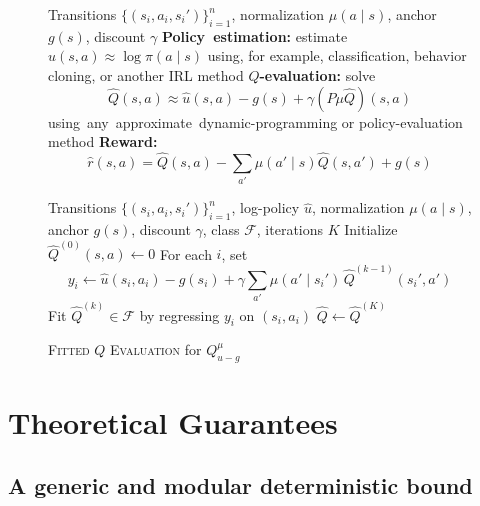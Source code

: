 \documentclass{article}
\newcommand{\1}{\mathbbm{1}}
\begin{document}
\begin{figure}[t]
\centering

\begin{minipage}[t]{0.48\linewidth}
\begin{algorithm}[H]
\caption{\textsc{Generalized Policy-to-\(Q\)-to-Reward (GenPQR)}}
\label{alg:generic-irl}
\begin{algorithmic}[1]
\INPUT Transitions \(\{(s_i,a_i,s_i')\}_{i=1}^n\), normalization \(\mu(a \mid s)\), anchor \(g(s)\), discount \(\gamma\)
\STATE \textbf{\mbox{Policy~estimation}:} estimate \(\hat u(s,a)\approx \log \pi(a\mid s)\) using, for example, classification, behavior cloning, or another IRL method
\STATE \textbf{\(Q\)-evaluation:} solve
\[
\hat Q(s,a)\approx \hat u(s,a)-g(s)+\gamma (P\mu \hat Q)(s,a)
\]
\mbox{using any approximate dynamic-programming} or policy-evaluation method
\OUTPUT \textbf{Reward:}
\[
\hat r(s,a)=\hat Q(s,a)-\sum_{a'}\mu(a'\mid s)\hat Q(s,a')+g(s)
\]
\end{algorithmic}
\end{algorithm}
\end{minipage}
\hfill
\begin{minipage}[t]{0.48\linewidth}
\begin{algorithm}[H]
\caption{\textsc{Fitted $Q$ Evaluation} for \(Q^\mu_{\hat u-g}\)}
\label{alg:simple-irl}
\begin{algorithmic}[1]
\INPUT Transitions \(\{(s_i,a_i,s_i')\}_{i=1}^n\), log-policy \(\hat u\), normalization \(\mu(a\mid s)\), anchor \(g(s)\), discount \(\gamma\), class \(\mathcal{F}\), iterations \(K\)
\STATE Initialize \(\hat Q^{(0)}(s,a)\gets 0\)
    \STATE For each \(i\),  set
    \[
    y_i \gets \hat u(s_i,a_i)-g(s_i)+\gamma\sum_{a'}\mu(a'\mid s_i')\,\hat Q^{(k-1)}(s_i',a')
    \]
    \STATE Fit \(\hat Q^{(k)} \in \mathcal{F}\) by regressing \(y_i\) on \((s_i,a_i)\)
\ENDFOR
\OUTPUT \(\hat Q \gets \hat Q^{(K)}\)
\end{algorithmic}
\end{algorithm}
\end{minipage}

\end{figure}

\section{Theoretical Guarantees}
\label{sec:theory}

\subsection{A generic and modular deterministic bound}
\end{document}
